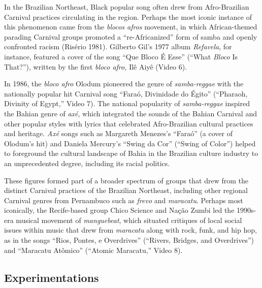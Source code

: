 \documentclass[twoside]{article}
\begin{document}
In the Brazilian Northeast, Black popular song often drew from
Afro-Brazilian Carnival practices circulating in the region. Perhaps the
most iconic instance of this phenomenon came from the \emph{blocos
afros} movement, in which African-themed parading Carnival groups
promoted a ``re-Africanized'' form of samba and openly confronted racism
(Risério 1981). Gilberto Gil's 1977 album \emph{Refavela}, for instance,
featured a cover of the song ``Que Bloco É Esse'' (``What \emph{Bloco}
Is That?''), written by the first \emph{bloco afro,} Ilê Aiyê (Video 6).

In 1986, the \emph{bloco afro} Olodum pioneered the genre of
\emph{samba-reggae} with the nationally popular hit Carnival song
``Faraó, Divinidade do Égito'' (``Pharaoh, Divinity of Egypt,'' Video
7). The national popularity of \emph{samba-reggae} inspired the Bahian
genre of \emph{axé}, which integrated the sounds of the Bahian Carnival
and other popular styles with lyrics that celebrated Afro-Brazilian
cultural practices and heritage. \emph{Axé} songs such as Margareth
Menezes's ``Faraó'' (a cover of Olodum's hit) and Daniela Mercury's
``Swing da Cor'' (``Swing of Color'') helped to foreground the cultural
landscape of Bahia in the Brazilian culture industry to an unprecedented
degree, including its racial politics.

These figures formed part of a broader spectrum of groups that drew from
the distinct Carnival practices of the Brazilian Northeast, including
other regional Carnival genres from Pernambuco such as \emph{frevo} and
\emph{maracatu}. Perhaps most iconically, the Recife-based group Chico
Science and Nação Zumbi led the 1990s-era musical movement of
\emph{manguebeat}, which situated critiques of local social issues
within music that drew from \emph{maracatu} along with rock, funk, and
hip hop, as in the songs ``Rios, Pontes, e Overdrives'' (``Rivers,
Bridges, and Overdrives'') and ``Maracatu Atômico'' (``Atomic
Maracatu,'' Video 8).

\hypertarget{experimentations}{%
\subsection*{Experimentations}\label{experimentations}}
\end{document}
